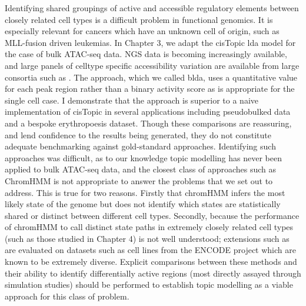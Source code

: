 Identifying shared groupings of active and accessible regulatory elements between closely related cell types is a difficult problem in functional genomics. It is especially relevant for cancers which have an unknown cell of origin, such as MLL-fusion driven leukemias. In Chapter 3, we adapt the cisTopic \gls{lda} model for the case of bulk ATAC-seq data. NGS data is becoming increasingly available, and large panels of celltype specific accessibility variation are available from large consortia such as \textcite{ENCODEProjectConsortium2012}. The approach, which we called \gls{blda}, uses a quantitative value for each peak region rather than a binary activity score as is appropriate for the single cell case. I demonstrate that the approach is superior to a naive implementation of cisTopic in several applications including pseudobulked data and a bespoke erythropoesis dataset. Though these comparisons are reassuring, and lend confidence to the results being generated, they do not constitute adequate benchmarking against gold-standard approaches. Identifying such approaches was difficult, as to our knowledge topic modelling has never been applied to bulk ATAC-seq data, and the closest class of approaches such as ChromHMM is not appropriate to answer the problems that we set out to address. This is true for two reasons. Firstly that chromHMM infers the most likely state of the genome but does not identify which states are statistically shared or distinct between different cell types. Secondly, because the performance of chromHMM to call distinct state paths in extremely closely related cell types (such as those studied in Chapter 4) is not well understood; extensions such as \textcite{Marco2017} are evaluated on datasets such as cell lines from the ENCODE project which are known to be extremely diverse. Explicit comparisons between these methods and their ability to identify differentially active regions (most directly assayed through simulation studies) should be performed to establish topic modelling as a viable approach for this class of problem.

